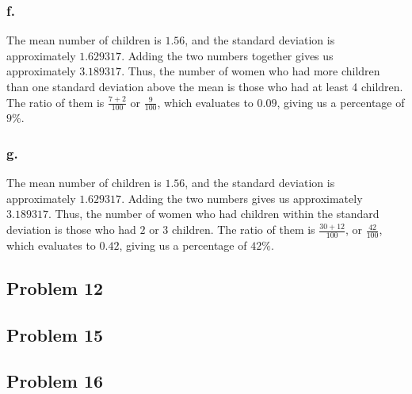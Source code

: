 \documentclass[11pt]{article}
\begin{document}
\subsubsection*{f.}
The mean number of children is $1.56$, and the standard deviation is
approximately $1.629317$. Adding the two numbers together gives us approximately
$3.189317$. Thus, the number of women who had more children than one
standard deviation above the mean is those who had at least 4 children. The
ratio of them is $\frac{7+2}{100}$ or $\frac{9}{100}$, which evaluates to
$0.09$, giving us a percentage of $9\%$.

\subsubsection*{g.}
The mean number of children is $1.56$, and the standard deviation is
approximately $1.629317$. Adding the two numbers gives us approximately
$3.189317$. Thus, the number of women who had children within the standard
deviation is those who had $2$ or $3$ children. The ratio of them is
$\frac{30+12}{100}$, or $\frac{42}{100}$, which evaluates to $0.42$, giving us a
percentage of $42\%$. 

\subsection*{Problem 12} %
\subsection*{Problem 15}
\subsection*{Problem 16}
\end{document}
